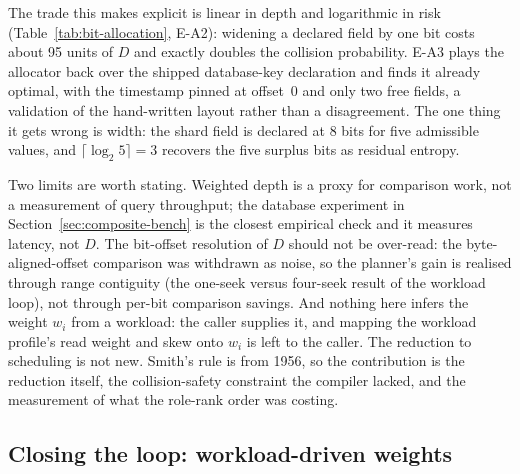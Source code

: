 \documentclass{svproc}
\begin{document}
The trade this makes explicit is linear in depth and logarithmic in risk
(Table~\ref{tab:bit-allocation}, E-A2): widening a declared field by one bit
costs about 95 units of $D$ and exactly doubles the collision probability. E-A3
plays the allocator back over the shipped database-key declaration and finds
it already optimal, with the timestamp pinned at offset~0 and only two free
fields, a validation of the hand-written layout rather than a
disagreement. The one thing it gets wrong is width: the shard field is declared
at 8 bits for five admissible values, and $\lceil \log_2 5 \rceil = 3$ recovers
the five surplus bits as residual entropy.

Two limits are worth stating. Weighted depth is a proxy for comparison work, not
a measurement of query throughput; the database experiment in
Section~\ref{sec:composite-bench} is the closest empirical check and it measures
latency, not $D$. The bit-offset resolution of $D$ should not be over-read: the byte-aligned-offset comparison was withdrawn as noise, so the planner's gain is realised through range contiguity (the one-seek versus four-seek result of the workload loop), not through per-bit comparison savings. And nothing here infers the weight $w_i$ from a workload: the
caller supplies it, and mapping the workload profile's read weight
and skew onto $w_i$ is left to the caller. The reduction to scheduling is not
new. Smith's rule is from 1956, so the contribution is the reduction
itself, the collision-safety constraint the compiler lacked, and the measurement
of what the role-rank order was costing.

\subsection{Closing the loop: workload-driven weights}
\label{sec:workload-planning}
\end{document}
